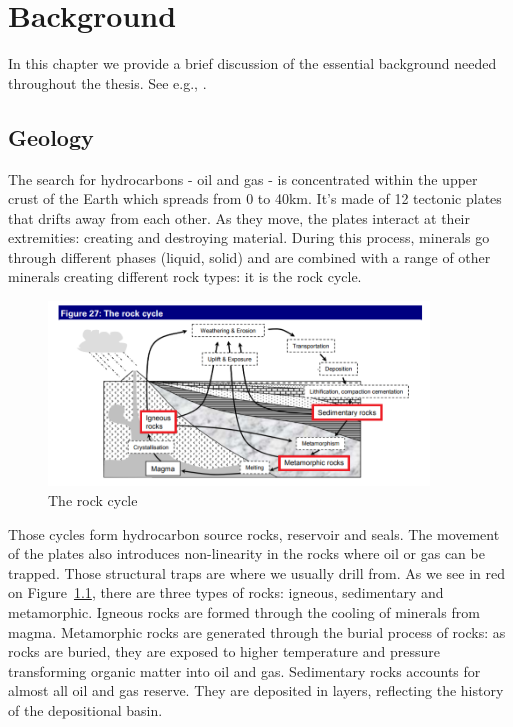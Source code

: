 \chapter{Background}
\label{chp:background}

In this chapter we provide a brief discussion of the essential background needed throughout the thesis. See e.g., \cite{Cover2006}.


\section{Geology}
The search for hydrocarbons - oil and gas - is concentrated within the upper crust of the Earth which spreads from 0 to 40km. It's made of 12 tectonic plates that drifts away from each other. As they move, the plates interact at their extremities: creating and destroying material. During this process, minerals go through different phases (liquid, solid) and are combined with a range of other minerals creating different rock types: it is the rock cycle. 
	\begin{figure}[!htp]
    \centering
        \includegraphics[width=0.9\textwidth]{./figures/02-rock-cycle}
        \caption{The rock cycle}\label{fig:rock-cycle}
    \end{figure}

Those cycles form hydrocarbon source rocks, reservoir and seals. The movement of the plates also introduces non-linearity in the rocks where oil or gas can be trapped. Those structural traps are where we usually drill from. As we see in red on Figure~\ref{fig:rock-cycle}, there are three types of rocks: igneous, sedimentary and metamorphic.  Igneous rocks are formed through the cooling of minerals from magma. Metamorphic rocks are generated through the burial process of rocks: as rocks are buried, they are exposed to higher temperature and pressure transforming organic matter into oil and gas. Sedimentary rocks accounts for almost all oil and gas reserve. They are deposited in layers, reflecting the history of the depositional basin.


